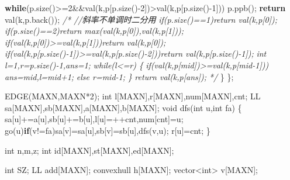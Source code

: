 \documentclass[
]{article}
\newenvironment{Shaded}{}{}
\newcommand{\CommentTok}[1]{\textcolor[rgb]{0.38,0.63,0.69}{\textit{#1}}}
\newcommand{\ControlFlowTok}[1]{\textcolor[rgb]{0.00,0.44,0.13}{\textbf{#1}}}
\newcommand{\DataTypeTok}[1]{\textcolor[rgb]{0.56,0.13,0.00}{#1}}
\newcommand{\DecValTok}[1]{\textcolor[rgb]{0.25,0.63,0.44}{#1}}
\newcommand{\NormalTok}[1]{#1}
\begin{document}
\begin{Shaded}
\begin{Highlighting}[]
        \ControlFlowTok{while}\NormalTok{(p.size()\textgreater{}=}\DecValTok{2}\NormalTok{\&\&val(k,p[p.size(){-}}\DecValTok{2}\NormalTok{])\textgreater{}val(k,p[p.size(){-}}\DecValTok{1}\NormalTok{]))}
\NormalTok{            p.ppb();}
        \ControlFlowTok{return}\NormalTok{ val(k,p.back());}
\CommentTok{/*      //斜率不单调时二分用}
\CommentTok{        if(p.size()==1)return val(k,p[0]);}
\CommentTok{        if(p.size()==2)return max(val(k,p[0]),val(k,p[1]));}
\CommentTok{        if(val(k,p[0])\textgreater{}=val(k,p[1]))return val(k,p[0]);}
\CommentTok{        if(val(k,p[p.size(){-}1])\textgreater{}=val(k,p[p.size(){-}2]))return val(k,p[p.size(){-}1]);}
\CommentTok{        int l=1,r=p.size(){-}1,ans=1;}
\CommentTok{        while(l\textless{}=r)}
\CommentTok{        \{}
\CommentTok{            if(val(k,p[mid])\textgreater{}=val(k,p[mid{-}1]))}
\CommentTok{                ans=mid,l=mid+1;}
\CommentTok{            else r=mid{-}1;}
\CommentTok{        \}}
\CommentTok{        return val(k,p[ans]);}
\CommentTok{*/}
\NormalTok{    \}}
\NormalTok{\};}

\NormalTok{EDGE(MAXN,MAXN*}\DecValTok{2}\NormalTok{);}
\DataTypeTok{int}\NormalTok{ l[MAXN],r[MAXN],num[MAXN],cnt;}
\NormalTok{LL sa[MAXN],sb[MAXN],a[MAXN],b[MAXN];}
\DataTypeTok{void}\NormalTok{ dfs(}\DataTypeTok{int}\NormalTok{ u,}\DataTypeTok{int}\NormalTok{ fa)}
\NormalTok{\{}
\NormalTok{    sa[u]+=a[u],sb[u]+=b[u],l[u]=++cnt,num[cnt]=u;}
\NormalTok{    go(u)}\ControlFlowTok{if}\NormalTok{(v!=fa)sa[v]=sa[u],sb[v]=sb[u],dfs(v,u);}
\NormalTok{    r[u]=cnt;}
\NormalTok{\}}

\DataTypeTok{int}\NormalTok{ n,m,z;}
\DataTypeTok{int}\NormalTok{ id[MAXN],st[MAXN],ed[MAXN];}

\DataTypeTok{int}\NormalTok{ SZ;}
\NormalTok{LL add[MAXN];}
\NormalTok{convexhull h[MAXN];}
\NormalTok{vector\textless{}}\DataTypeTok{int}\NormalTok{\textgreater{} v[MAXN];}


\end{Highlighting}
\end{Shaded}
\end{document}
